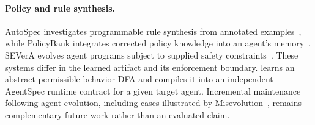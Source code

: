 \paragraph{Policy and rule synthesis.}
AutoSpec investigates programmable rule synthesis from annotated examples~\cite{ma2026autospec}, while PolicyBank integrates corrected policy knowledge into an agent's memory~\cite{choi2026policybank}. SEVerA evolves agent programs subject to supplied safety constraints~\cite{banerjee2026severa}. These systems differ in the learned artifact and its enforcement boundary. \system learns an abstract permissible-behavior DFA and compiles it into an independent AgentSpec runtime contract for a given target agent. Incremental maintenance following agent evolution, including cases illustrated by Misevolution~\cite{shao2025misevolve}, remains complementary future work rather than an evaluated claim.
